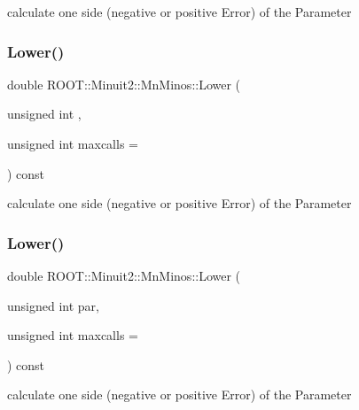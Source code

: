 calculate one side (negative or positive Error) of the Parameter 

\mbox{\label{classROOT_1_1Minuit2_1_1MnMinos_a0e6c6ab67bdd7b3461d900f64b4908ba}} 
\subsubsection{\texorpdfstring{Lower()}{Lower()}\hspace{0.1cm}{\footnotesize\ttfamily [2/3]}}
{\footnotesize\ttfamily double R\+O\+O\+T\+::\+Minuit2\+::\+Mn\+Minos\+::\+Lower (\begin{DoxyParamCaption}\item[{unsigned int}]{,  }\item[{unsigned int}]{maxcalls = {} }\end{DoxyParamCaption}) const}



calculate one side (negative or positive Error) of the Parameter 

\mbox{\label{classROOT_1_1Minuit2_1_1MnMinos_a0e6c6ab67bdd7b3461d900f64b4908ba}} 
\subsubsection{\texorpdfstring{Lower()}{Lower()}\hspace{0.1cm}{\footnotesize\ttfamily [3/3]}}
{\footnotesize\ttfamily double R\+O\+O\+T\+::\+Minuit2\+::\+Mn\+Minos\+::\+Lower (\begin{DoxyParamCaption}\item[{unsigned int}]{par,  }\item[{unsigned int}]{maxcalls = {} }\end{DoxyParamCaption}) const}



calculate one side (negative or positive Error) of the Parameter 

